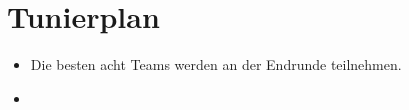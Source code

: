 \documentclass[a4paper,12pt]{article}
\begin{document}
\pagebreak
\section{Tunierplan}
\begin{itemize}
        \item Die besten acht Teams werden an der Endrunde teilnehmen.
        \item \tournamentQualification
\end{itemize}
\tournamentScoring
\combinedTournament
\end{document}
